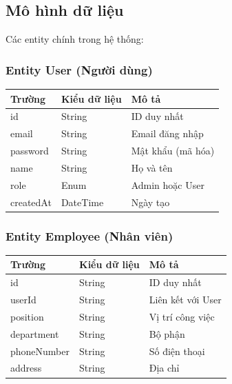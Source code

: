 \documentclass[12pt,a4paper]{report}
\begin{document}
\subsection{Mô hình dữ liệu}

Các entity chính trong hệ thống:

\subsubsection{Entity User (Người dùng)}
\begin{table}[H]
    \centering
    \begin{tabular}{|l|l|l|}
        \hline
        \textbf{Trường} & \textbf{Kiểu dữ liệu} & \textbf{Mô tả} \\
        \hline
        id & String & ID duy nhất \\
        email & String & Email đăng nhập \\
        password & String & Mật khẩu (mã hóa) \\
        name & String & Họ và tên \\
        role & Enum & Admin hoặc User \\
        createdAt & DateTime & Ngày tạo \\
        \hline
    \end{tabular}
\end{table}

\subsubsection{Entity Employee (Nhân viên)}
\begin{table}[H]
    \centering
    \begin{tabular}{|l|l|l|}
        \hline
        \textbf{Trường} & \textbf{Kiểu dữ liệu} & \textbf{Mô tả} \\
        \hline
        id & String & ID duy nhất \\
        userId & String & Liên kết với User \\
        position & String & Vị trí công việc \\
        department & String & Bộ phận \\
        phoneNumber & String & Số điện thoại \\
        address & String & Địa chỉ \\
        \hline
    \end{tabular}
\end{table}

\newpage
\end{document}
